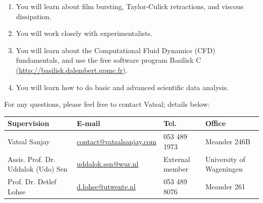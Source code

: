 \documentclass[a4paper,10pt]{article}
\begin{document}
\begin{enumerate}
\item You will learn about film bursting, Taylor-Culick retractions, and viscous dissipation. 
\item You will work closely with experimentalists. 
\item You will learn about the Computational Fluid Dynamics (CFD) fundamentals, and use the free software program Basilisk C \href{http://basilisk.dalembert.upmc.fr}{(http://basilisk.dalembert.upmc.fr)}.
\item You will learn how to do basic and advanced scientific data analysis.
\end{enumerate}
For any questions, please feel free to contact Vatsal; details below: 

\begin{center}
	\begin{tabular}{|l|l|l|l|}
		\hline \textbf{Supervision} & \textbf{E-mail} & \textbf{Tel.} & \textbf{Office} \\ 
		\hline Vatsal Sanjay & \href{mailto:contact@vatsalsanjay.com}{contact@vatsalsanjay.com} & 053 489 1973 & Meander 246B \\ 
		\hline Assis. Prof. Dr. Uddalok (Udo) Sen & \href{mailto:uddalok.sen@wur.nl }{uddalok.sen@wur.nl} & External member & University of Wageningen \\ 
		\hline Prof. Dr. Detlef Lohse & \href{mailto:d.lohse@utwente.nl}{d.lohse@utwente.nl} & 053 489 8076 & Meander 261 \\ 
		\hline 
	\end{tabular} 
\end{center}



\end{document}
